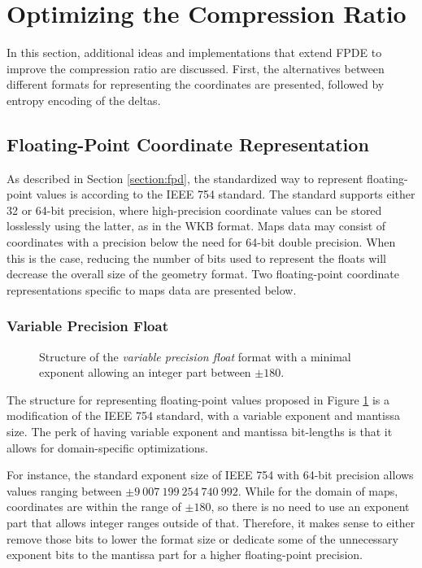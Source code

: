 \section{Optimizing the Compression Ratio}
In this section, additional ideas and implementations that extend FPDE to improve the compression ratio are discussed. First, the alternatives between different formats for representing the coordinates are presented, followed by entropy encoding of the deltas.

\subsection{Floating-Point Coordinate Representation}
\label{sec:delta_mod}
As described in Section \ref{section:fpd}, the standardized way to represent floating-point values is according to the IEEE 754 standard. The standard supports either 32 or 64-bit precision, where high-precision coordinate values can be stored losslessly using the latter, as in the WKB format. Maps data may consist of coordinates with a precision below the need for 64-bit double precision. When this is the case, reducing the number of bits used to represent the floats will decrease the overall size of the geometry format. Two floating-point coordinate representations specific to maps data are presented below.

\subsubsection{Variable Precision Float}
\begin{figure}[htbp]
    \centering
    
    \caption{Structure of the \textit{variable precision float} format with a minimal exponent allowing an integer part between \(\pm 180\).}
    \label{img:variable_precision}
\end{figure}

The structure for representing floating-point values proposed in Figure \ref{img:variable_precision} is a modification of the IEEE 754 standard, with a variable exponent and mantissa size. The perk of having variable exponent and mantissa bit-lengths is that it allows for domain-specific optimizations.

For instance, the standard exponent size of IEEE 754 with 64-bit precision allows values ranging between $\pm 9\ 007\ 199\ 254\ 740\ 992$. While for the domain of maps, coordinates are within the range of $\pm 180$, so there is no need to use an exponent part that allows integer ranges outside of that. Therefore, it makes sense to either remove those bits to lower the format size or dedicate some of the unnecessary exponent bits to the mantissa part for a higher floating-point precision.

